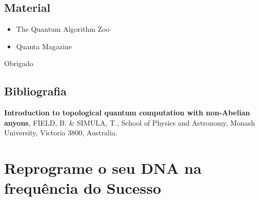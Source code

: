 \documentclass[t]{beamer}
\begin{document}
	\begin{frame}{\subsecname}
	
	\end{frame}
	
	\subsection{Material}
	
	\begin{frame}{\subsecname}
		\begin{itemize}
			\item The Quantum Algorithm Zoo
			\item Quanta Magazine
		\end{itemize}
	
	\end{frame}
	
	\begin{frame}
		Obrigado
	\end{frame}
	
	\subsection{Bibliografia}
	
	\begin{frame}{\subsecname}
		
		 \textbf{Introduction to topological quantum computation with non-Abelian anyons}, FIELD, B. \& SIMULA, T., School of Physics and Astronomy, Monash University, Victoria 3800, Australia.
		
		\bibitem{}
	\end{frame}
	
	\section*{Reprograme o seu DNA na frequência do Sucesso}
	
	\begin{frame}
	
	\end{frame}
\end{document}
